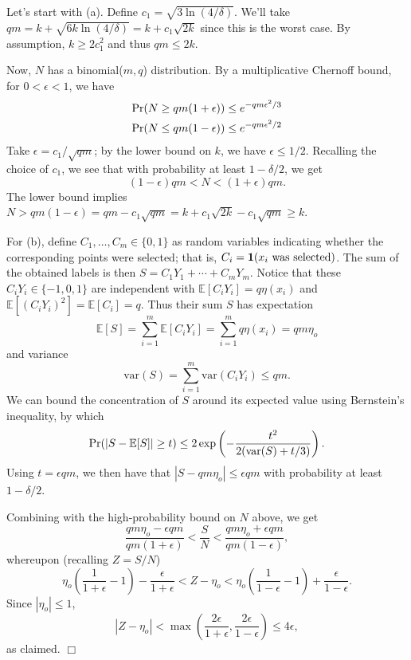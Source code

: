 \documentclass{article}
\def\pr{{\rm Pr}}
\def\E{{\mathbb E}}
\newenvironment{proof}{\noindent {\sc Proof:}}{$\Box$ \medskip}
\begin{document}
\begin{proof}
Let's start with (a). Define $c_1 = \sqrt{3 \ln (4/\delta)}$. We'll take $qm = k + \sqrt{6k \ln (4/\delta)} = k + c_1 \sqrt{2k}$ since this is the worst case. By assumption, $k \geq 2c_1^2$ and thus $qm \leq 2k$.

Now, $N$ has a binomial($m,q$) distribution. By a multiplicative Chernoff bound, for $0 < \epsilon < 1$, we have
\begin{align*}
\pr(N \geq qm(1+\epsilon)) &\leq e^{-qm\epsilon^2/3} \\
\pr(N \leq qm(1-\epsilon)) &\leq e^{-qm\epsilon^2/2}
\end{align*}
Take $\epsilon = c_1/\sqrt{qm}$; by the lower bound on $k$, we have $\epsilon \leq 1/2$. Recalling the choice of $c_1$, we see that with probability at least $1-\delta/2$, we get 
$$(1-\epsilon) qm < N < (1+\epsilon) qm .$$
The lower bound implies $N > qm(1-\epsilon) = qm - c_1\sqrt{qm} = k + c_1 \sqrt{2k} - c_1 \sqrt{qm} \geq k$.

For (b), define $C_1, \ldots, C_m \in \{0,1\}$ as random variables indicating whether the corresponding points were selected; that is, $C_i = {\bf 1}(\mbox{$x_i$ was selected})$. The sum of the obtained labels is then $S = C_1 Y_1 + \cdots + C_m Y_m$. Notice that these $C_iY_i \in \{-1,0,1\}$ are independent with $\E[C_iY_i] = q \eta(x_i)$ and $\E[(C_iY_i)^2] = \E[C_i] = q$. Thus their sum $S$ has expectation
$$ \E [S] = \sum_{i=1}^m \E[C_i Y_i] = \sum_{i=1}^m q \eta(x_i) = qm \eta_o $$
and variance
$$ \mbox{var}(S) = \sum_{i=1}^m \mbox{var}(C_iY_i) \leq qm .$$
We can bound the concentration of $S$ around its expected value using Bernstein's inequality, by which
$$ \pr(|S - \E[S]| \geq t) \leq 2 \exp \left( - \frac{t^2}{2(\mbox{var}(S) + t/3)} \right) .$$
Using $t = \epsilon qm$, we then have that $|S - qm \eta_o| \leq \epsilon qm$ with probability at least $1-\delta/2$.

Combining with the high-probability bound on $N$ above, we get
$$ \frac{qm \eta_o - \epsilon qm}{qm(1+\epsilon)} < \frac{S}{N} < \frac{qm \eta_o + \epsilon qm}{qm(1-\epsilon)},$$
whereupon (recalling $Z = S/N$)
$$ 
\eta_o \left( \frac{1}{1+\epsilon} -1 \right) - \frac{\epsilon}{1+\epsilon} < Z - \eta_o < \eta_o \left( \frac{1}{1-\epsilon} - 1 \right) + \frac{\epsilon}{1-\epsilon} .$$
Since $|\eta_o| \leq 1$,
$$ |Z - \eta_o | < \max \left( \frac{2\epsilon}{1+\epsilon}, \frac{2\epsilon}{1-\epsilon} \right)
\leq 
4 \epsilon,$$
as claimed.  
\end{proof}
\end{document}
